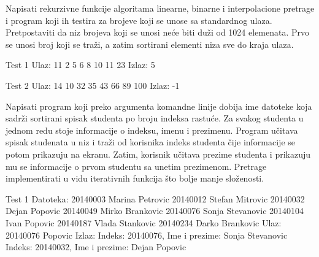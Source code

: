 \begin{Exercise}[label=402]
  Napisati rekurzivne funkcije algoritama linearne, binarne i
  interpolacione pretrage i program koji ih testira za brojeve koji se
  unose sa standardnog ulaza. Pretpostaviti da niz brojeva koji se
  unosi neće biti duži od 1024 elemenata. Prvo se unosi broj koji se
  traži, a zatim sortirani elementi niza sve do kraja ulaza.

\begin{miditest}
\begin{test}{Test 1}
Ulaz:   11 2 5 6 8 10 11 23
Izlaz:  5
\end{test}
\end{miditest}

\begin{miditest}
\begin{test}{Test 2}
Ulaz:   14 10 32 35 43 66 89 100
Izlaz:  -1  
\end{test}
\end{miditest}
  
\end{Exercise}

\begin{Exercise}[label=403]
  Napisati program koji preko argumenta komandne linije dobija ime
  datoteke koja sadrži sortirani spisak studenta po broju indeksa
  rastuće. Za svakog studenta u jednom redu stoje informacije o
  indeksu, imenu i prezimenu.  Program učitava spisak studenata u niz
  i traži od korisnika indeks studenta čije informacije se potom
  prikazuju na ekranu.  Zatim, korisnik učitava prezime studenta i
  prikazuju mu se informacije o prvom studentu sa unetim prezimenom.
  Pretrage implementirati u vidu iterativnih funkcija što bolje manje
  složenosti.
  
\begin{maxitest}
\begin{test}{Test 1}
Datoteka:
20140003 Marina Petrovic
20140012 Stefan Mitrovic
20140032 Dejan Popovic
20140049 Mirko Brankovic
20140076 Sonja Stevanovic
20140104 Ivan Popovic
20140187 Vlada Stankovic
20140234 Darko Brankovic
Ulaz:
20140076
Popovic
Izlaz:
Indeks: 20140076, Ime i prezime: Sonja Stevanovic
Indeks: 20140032, Ime i prezime: Dejan Popovic
\end{test}
\end{maxitest}
  
\end{Exercise}

